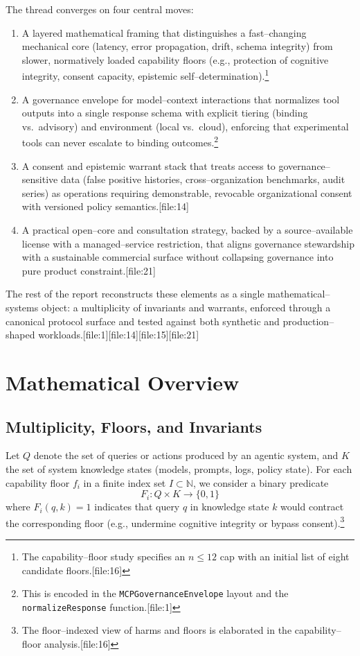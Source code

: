 \documentclass[11pt]{article}
\begin{document}
The thread converges on four central moves:
\begin{enumerate}[leftmargin=*]
  \item A layered mathematical framing that distinguishes a fast--changing mechanical core (latency, error propagation, drift, schema integrity) from slower, normatively loaded capability floors (e.g., protection of cognitive integrity, consent capacity, epistemic self--determination).\footnote{The capability--floor study specifies an \(n \leq 12\) cap with an initial list of eight candidate floors.[file:16]} 
  \item A governance envelope for model--context interactions that normalizes tool outputs into a single response schema with explicit tiering (binding vs.\ advisory) and environment (local vs.\ cloud), enforcing that experimental tools can never escalate to binding outcomes.\footnote{This is encoded in the \texttt{MCPGovernanceEnvelope} layout and the \texttt{normalizeResponse} function.[file:1]} 
  \item A consent and epistemic warrant stack that treats access to governance--sensitive data (false positive histories, cross--organization benchmarks, audit series) as operations requiring demonstrable, revocable organizational consent with versioned policy semantics.[file:14] 
  \item A practical open--core and consultation strategy, backed by a source--available license with a managed--service restriction, that aligns governance stewardship with a sustainable commercial surface without collapsing governance into pure product constraint.[file:21] 
\end{enumerate}

The rest of the report reconstructs these elements as a single mathematical--systems object: a multiplicity of invariants and warrants, enforced through a canonical protocol surface and tested against both synthetic and production--shaped workloads.[file:1][file:14][file:15][file:21]

\section{Mathematical Overview}

\subsection{Multiplicity, Floors, and Invariants}

Let \(Q\) denote the set of queries or actions produced by an agentic system, and \(K\) the set of system knowledge states (models, prompts, logs, policy state). For each capability floor \(f_i\) in a finite index set \(I \subset \mathbb{N}\), we consider a binary predicate
\[
  F_i \colon Q \times K \to \{0,1\}
\]
where \(F_i(q,k) = 1\) indicates that query \(q\) in knowledge state \(k\) would contract the corresponding floor (e.g., undermine cognitive integrity or bypass consent).\footnote{The floor--indexed view of harms and floors is elaborated in the capability--floor analysis.[file:16]}
\end{document}
